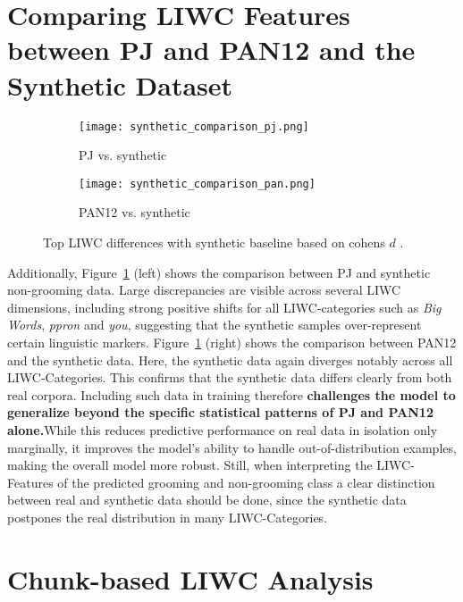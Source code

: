 \section{Comparing LIWC Features between PJ and PAN12 and the Synthetic Dataset} \label{sec:liwc_synthetic_comparison}
\begin{figure}[ht]
  \centering
  \begin{subfigure}[t]{0.48\textwidth}
    \texttt{[image: synthetic\_comparison\_pj.png]}
    \caption{PJ vs. synthetic}
  \end{subfigure}\hfill
  \begin{subfigure}[t]{0.48\textwidth}
    \texttt{[image: synthetic\_comparison\_pan.png]}
    \caption{PAN12 vs. synthetic}
  \end{subfigure}
  \caption[Top 30 LIWC Differences with Synthetic Baseline]{Top LIWC differences with synthetic baseline based on cohens $d$ \cite{cohen1988}.}
  \label{fig:liwc_synth_side_by_side}
\end{figure}



Additionally, Figure~\ref{fig:liwc_synth_side_by_side} (left) shows the comparison between PJ and synthetic non-grooming data. Large discrepancies are visible across several LIWC dimensions, including strong positive shifts for all LIWC-categories such as \textit{Big Words}, \textit{ppron} and \textit{you}, suggesting that the synthetic samples over-represent certain linguistic markers.  Figure~\ref{fig:liwc_synth_side_by_side} (right) shows the comparison between PAN12 and the synthetic data. Here, the synthetic data again diverges notably across all LIWC-Categories. This confirms that the synthetic data differs clearly from both real corpora. Including such data in training therefore \textbf{challenges the model to generalize beyond the specific statistical patterns of PJ and PAN12 alone.}While this reduces predictive performance on real data in isolation only marginally, it improves the model’s ability to handle out-of-distribution examples, making the overall model more robust. Still, when interpreting the LIWC-Features of the predicted grooming and non-grooming class a clear distinction between real and synthetic data should be done, since the synthetic data postpones the real distribution in many LIWC-Categories.


\section{Chunk-based LIWC Analysis} \label{sec:chunk_based_liwc_analysis}


